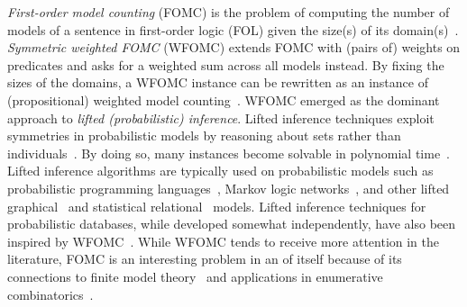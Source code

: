 \documentclass{article}
\theoremstyle{definition}
\begin{document}
\emph{First-order model counting} (FOMC) is the problem of computing the number
of models of a sentence in first-order logic (FOL) given the size(s) of its
domain(s)~\cite{DBLP:conf/pods/BeameBGS15}. \emph{Symmetric weighted FOMC}
(WFOMC) extends FOMC with (pairs of) weights on predicates and asks for a
weighted sum across all models instead. By fixing the sizes of the domains, a
WFOMC instance can be rewritten as an instance of (propositional) weighted model
counting~\cite{DBLP:journals/ai/ChaviraD08}. WFOMC emerged as the dominant
approach to \emph{lifted (probabilistic) inference}. Lifted inference techniques
exploit symmetries in probabilistic models by reasoning about sets rather than
individuals~\cite{DBLP:conf/ecai/Kersting12}. By doing so, many instances become
solvable in polynomial time~\cite{DBLP:conf/nips/Broeck11}. Lifted inference
algorithms are typically used on probabilistic models such as probabilistic
programming
languages~\cite{DBLP:journals/ml/RaedtK15,DBLP:journals/ijar/RiguzziBZCL17},
Markov logic
networks~\cite{DBLP:conf/ijcai/BroeckTMDR11,DBLP:journals/cacm/GogateD16,DBLP:journals/ml/RichardsonD06},
and other lifted graphical~\cite{DBLP:journals/ml/KimmigMG15} and statistical
relational~\cite{DBLP:series/synthesis/2016Raedt} models. Lifted inference
techniques for probabilistic databases, while developed somewhat independently,
have also been inspired by
WFOMC~\cite{DBLP:journals/pvldb/GatterbauerS15,DBLP:journals/debu/GribkoffSB14}.
While WFOMC tends to receive more attention in the literature, FOMC is an
interesting problem in an of itself because of its connections to finite model
theory~\cite{DBLP:conf/kr/BremenK21} and applications in enumerative
combinatorics~\cite{DBLP:conf/ilp/BarvinekB0ZK21}.

\end{document}
